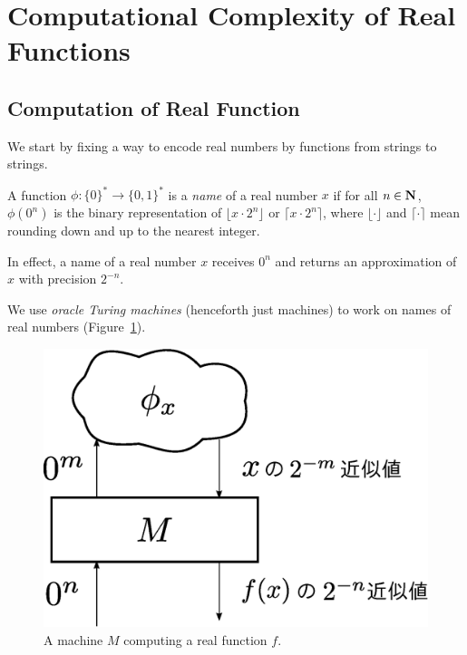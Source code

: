 \section{Computational Complexity of Real Functions}
\label{section: preliminaries}

\subsection{Computation of Real Function}

We start by fixing a way to encode real numbers 
by functions from strings to strings.
\begin{definition}
 A function $\phi \colon \{0\} ^* \to \{0, 1\}^*$ is a \emph{name} of a real number $x$ 
 if for all $n \in \mathbf N$,
  $\phi(0^n)$ is the binary representation of $\lfloor x \cdot 2^n \rfloor$ or
  $\lceil x \cdot 2^n \rceil$,
 where $\lfloor \cdot \rfloor$ and $\lceil \cdot \rceil$ mean
 rounding down and up to the nearest integer.
 \end{definition}
In effect, a name of a real number $x$ receives $0 ^n$ and returns an approximation of $x$ with precision $2^{-n}$.

We use \emph{oracle Turing machines} (henceforth just machines)
to work on names of real numbers (Figure~\ref{fig:model-of-function}).

 \begin{figure}
  \begin{center}
   \includegraphics[height=0.15\textheight]{image/model-of-function.eps}
  \end{center}
  \caption{A machine $M$ computing a real function $f$.}
  \label{fig:model-of-function}
 \end{figure}

